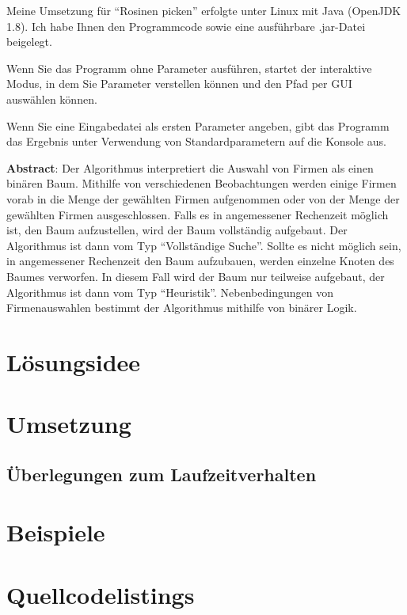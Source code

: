 \documentclass[a4paper, DIV=12, firstfoot=false, dvipsnames]{scrreprt}
\newcommand{\task}[1]{Rosinen picken}
\begin{document}
	\titlehead{Teilnahme 6745 (Team 00001) \hfill Laurenz Grote}
	\title{\task}
	\subtitle{Aufgabe 1}
	\author{Laurenz Friedrich Grote}
	\date{}
	\maketitle
	\tableofcontents
	\vspace {2em}
	Meine Umsetzung für "`\task{}"' erfolgte unter Linux mit Java (OpenJDK 1.8). Ich habe Ihnen den Programmcode sowie eine ausführbare .jar-Datei beigelegt.

	Wenn Sie das Programm ohne Parameter ausführen, startet der interaktive Modus, in dem Sie Parameter verstellen können und den Pfad per GUI auswählen können.

	Wenn Sie eine Eingabedatei als ersten Parameter angeben, gibt das Programm das Ergebnis unter Verwendung von Standardparametern auf die Konsole aus.

	\vfill{}
	\textbf{Abstract}:
	Der Algorithmus interpretiert die Auswahl von Firmen als einen binären Baum. Mithilfe von verschiedenen Beobachtungen werden einige Firmen vorab in die Menge der gewählten Firmen aufgenommen oder von der Menge der gewählten Firmen ausgeschlossen. Falls es in angemessener Rechenzeit möglich ist, den Baum aufzustellen, wird der Baum vollständig aufgebaut. Der Algorithmus ist dann vom Typ "`Vollständige Suche"'. Sollte es nicht möglich sein, in angemessener Rechenzeit den Baum aufzubauen, werden einzelne Knoten des Baumes verworfen. In diesem Fall wird der Baum nur teilweise aufgebaut, der Algorithmus ist dann vom Typ "`Heuristik"'. Nebenbedingungen von Firmenauswahlen bestimmt der Algorithmus mithilfe von binärer Logik. 

	\pagebreak
	\chapter{Lösungsidee}
		
	\chapter{Umsetzung}
		
		\newpage
		\section{Überlegungen zum Laufzeitverhalten}
			
	\chapter{Beispiele}
		
	\chapter{Quellcodelistings}
		
\end{document}
